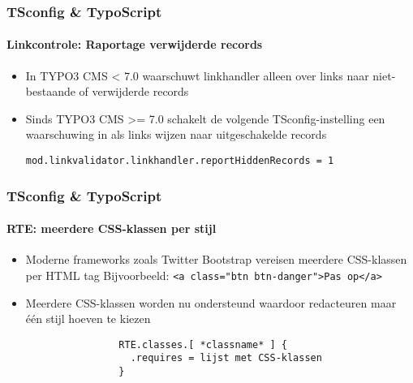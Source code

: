 \begin{frame}[fragile]
	\frametitle{TSconfig \& TypoScript}
	\framesubtitle{Linkcontrole: Raportage verwijderde records}

	\begin{itemize}
		\item In TYPO3 CMS < 7.0 waarschuwt linkhandler alleen over links naar niet-bestaande of verwijderde records
		\item Sinds TYPO3 CMS >=  7.0 schakelt de volgende TSconfig-instelling een waarschuwing in als links wijzen naar uitgeschakelde records

			\lstinline!mod.linkvalidator.linkhandler.reportHiddenRecords = 1!

	\end{itemize}

\end{frame}


\begin{frame}[fragile]
	\frametitle{TSconfig \& TypoScript}
	\framesubtitle{RTE: meerdere CSS-klassen per stijl}

	\begin{itemize}
		\item Moderne frameworks zoals Twitter Bootstrap vereisen meerdere CSS-klassen per HTML tag\newline
			\small Bijvoorbeeld: \texttt{<a class="btn btn-danger">Pas op</a>}\normalsize
		\item Meerdere CSS-klassen worden nu ondersteund waardoor redacteuren maar één stijl hoeven te kiezen

			\begin{lstlisting}
				RTE.classes.[ *classname* ] {
				  .requires = lijst met CSS-klassen
				}
			\end{lstlisting}

	\end{itemize}

\end{frame}


